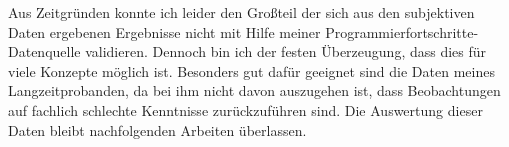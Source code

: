 \begin{description}
  Aus Zeitgründen konnte ich leider den Großteil der sich aus den subjektiven Daten ergebenen Ergebnisse nicht mit Hilfe meiner Programmierfortschritte-Datenquelle validieren. Dennoch bin ich der festen Überzeugung, dass dies für viele Konzepte möglich ist. Besonders gut dafür geeignet sind die Daten meines Langzeitprobanden, da bei ihm nicht davon auszugehen ist, dass Beobachtungen auf fachlich schlechte Kenntnisse zurückzuführen sind. Die Auswertung dieser Daten bleibt nachfolgenden Arbeiten überlassen. 
  

  
\end{description}

\bigskip

